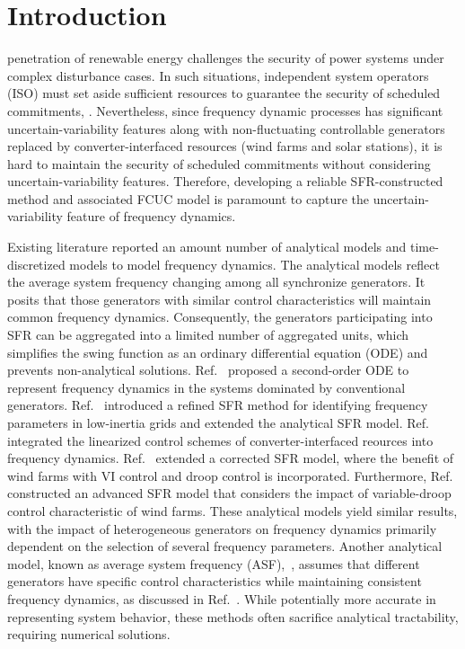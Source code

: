\documentclass[lettersize,journal]{IEEEtran}
\begin{document}
\section{Introduction}

 penetration of renewable energy challenges the security of power systems under complex disturbance cases. In such situations, independent system operators (ISO) must set aside sufficient resources to guarantee the security of scheduled commitments, \cite{9613814}. Nevertheless, since frequency dynamic processes has significant uncertain-variability features along with non-fluctuating controllable generators replaced by converter-interfaced resources (wind farms and solar stations), it is hard to maintain the security of scheduled commitments without considering uncertain-variability features. Therefore, developing a reliable SFR-constructed method and associated FCUC model is paramount to capture the uncertain-variability feature of frequency dynamics.

Existing literature reported an amount number of analytical models and time-discretized models to model frequency dynamics. The analytical models reflect the average system frequency changing among all synchronize generators. It posits that those generators with similar control characteristics will maintain common frequency dynamics. Consequently, the generators participating into SFR can be aggregated into a limited number of aggregated units, which simplifies the swing function as an ordinary differential equation (ODE) and prevents non-analytical solutions. Ref.~\cite{anderson1990low} proposed a second-order ODE to represent frequency dynamics in the systems dominated by conventional generators. Ref.~\cite{shi2018analytical,huang2025wind} introduced a refined SFR method for identifying frequency parameters in low-inertia grids and extended the analytical SFR model. Ref.~\cite{shen2020frequency} integrated the linearized control schemes of converter-interfaced reources into frequency dynamics. Ref.~\cite{paturet2020stochastic,9712362,zhang2020modeling,markovic2018lqr,ding2021two} extended a corrected SFR model, where the benefit of wind farms with VI control and droop control is incorporated. Furthermore, Ref.~\cite{9765359} constructed an advanced SFR model that considers the impact of variable-droop control characteristic of wind farms. These analytical models yield similar results, with the impact of heterogeneous generators on frequency dynamics primarily dependent on the selection of several frequency parameters. Another analytical model, known as average system frequency (ASF),~\cite{garcia2021requirements,9449643}, assumes that different generators have specific control characteristics while maintaining consistent frequency dynamics, as discussed in Ref.~\cite{garcia2021requirements,9449643}. While potentially more accurate in representing system behavior, these methods often sacrifice analytical tractability, requiring numerical solutions.
\end{document}
